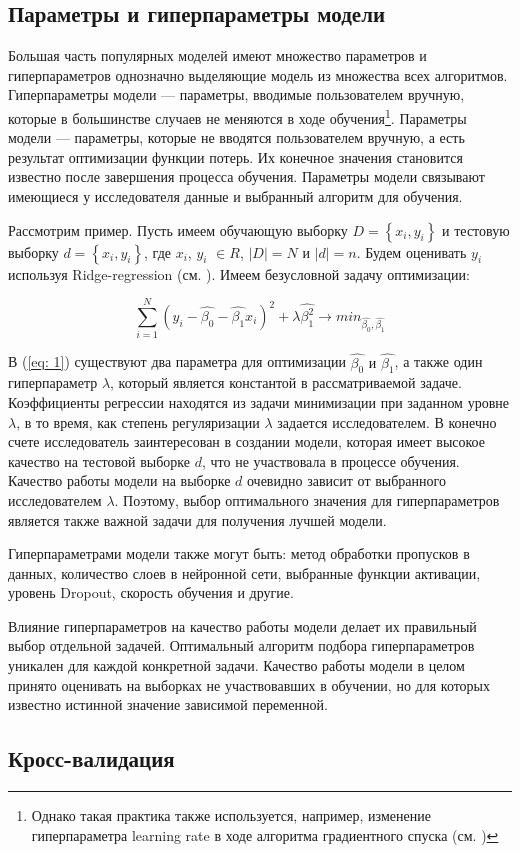 \documentclass[a4paper, 14pt]{article}
\begin{document}
\subsection{Параметры и гиперпараметры модели}
Большая часть популярных моделей имеют множество параметров и гиперпараметров однозначно выделяющие модель из множества всех алгоритмов. Гиперпараметры модели --- параметры, вводимые пользователем вручную, которые в большинстве случаев не меняются в ходе обучения\footnote{Однако такая практика также используется, например, изменение гиперпараметра  learning rate в ходе алгоритма градиентного спуска (см. \cite{zeiler2012adadelta})}. Параметры модели --- параметры, которые не вводятся пользователем вручную, а есть результат оптимизации функции потерь. Их конечное значения становится известно после завершения процесса обучения. Параметры модели связывают имеющиеся у исследователя данные и выбранный алгоритм для обучения. 

Рассмотрим пример. Пусть имеем обучающую выборку $D = \left\{x_i, y_i\right\}$ и тестовую выборку $d = \left\{x_i, y_i\right\}$, где $x_i$, $y_i$ $\in R$, $\left|D\right| = N$ и $\left|d\right| = n$. Будем оценивать $y_i$ используя Ridge-regression (см. \cite{hoerl1970ridge}). Имеем безусловной задачу оптимизации:


\begin{equation} 
\sum_{i=1}^{N} (y_i - \hat{\beta_0} - \hat{\beta_1} x_i)^2 + \lambda \hat{\beta_1^2} \rightarrow min_{\hat{\beta_0}, \hat{\beta_1}}
\end{equation} \label{eq: 1}

В (\ref{eq: 1}) существуют два параметра для оптимизации $\hat{\beta_0} \text{ и } \hat{\beta_1}$, а также один гиперпараметр $\lambda$, который является константой в рассматриваемой задаче. Коэффициенты регрессии находятся из задачи минимизации при заданном уровне $\lambda$, в то время, как степень регуляризации $\lambda$ задается исследователем. В конечно счете исследователь заинтересован в создании модели, которая имеет высокое качество на тестовой выборке $d$, что не участвовала в процессе обучения. Качество работы модели на выборке $d$ очевидно зависит от выбранного исследователем $\lambda$. Поэтому, выбор оптимального значения для гиперпараметров является также важной задачи для получения лучшей модели.

Гиперпараметрами модели также могут быть: метод обработки пропусков в данных, количество слоев в нейронной сети, выбранные функции активации, уровень Dropout, скорость обучения и другие. 

Влияние гиперпараметров на качество работы модели делает их правильный выбор отдельной задачей. Оптимальный алгоритм подбора гиперпараметров уникален для каждой конкретной задачи. Качество работы модели в целом принято оценивать на выборках не участвовавших в обучении, но для которых известно истинной значение зависимой переменной. 

\subsection{Кросс-валидация}

\newpage
\end{document}
